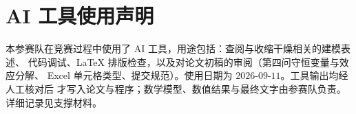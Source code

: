 \section*{AI 工具使用声明}
本参赛队在竞赛过程中使用了 AI 工具，用途包括：查阅与收缩干燥相关的建模表述、
代码调试、LaTeX 排版检查，以及对论文初稿的审阅（第四问守恒变量与效应分解、
Excel 单元格类型、提交规范）。使用日期为 $2026$-$09$-$11$。工具输出均经人工核对后
才写入论文与程序；数学模型、数值结果与最终文字由参赛队负责。详细记录见支撑材料。
